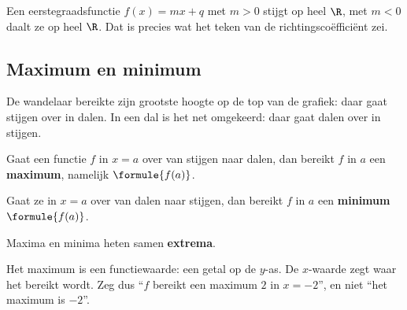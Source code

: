 
Een eerstegraadsfunctie $f(x) = mx + q$ met $m > 0$ stijgt op heel $\R$, met $m < 0$ daalt ze op heel $\R$. Dat is precies wat het teken van de richtingscoëfficiënt zei.

\subsection{Maximum en minimum}

De wandelaar bereikte zijn grootste hoogte op de top van de grafiek: daar gaat stijgen over in dalen. In een dal is het net omgekeerd: daar gaat dalen over in stijgen.

\begin{theorie}
Gaat een functie $f$ in $x = a$ over van stijgen naar dalen, dan bereikt $f$ in $a$ een \textbf{\textcolor{accent}{maximum}}, namelijk $\formule{f(a)}$.

Gaat ze in $x = a$ over van dalen naar stijgen, dan bereikt $f$ in $a$ een \textbf{\textcolor{accent}{minimum}} $\formule{f(a)}$.

Maxima en minima heten samen \textbf{\textcolor{accent}{extrema}}.
\end{theorie}

Het maximum is een functiewaarde: een getal op de $y$-as. De $x$-waarde zegt waar het bereikt wordt. Zeg dus ``$f$ bereikt een maximum $2$ in $x = -2$'', en niet ``het maximum is $-2$''.

